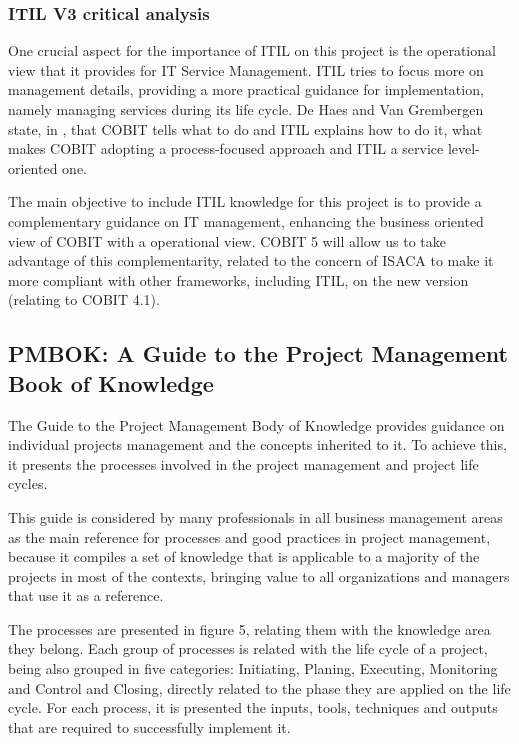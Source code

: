 \subsubsection{ITIL V3 critical analysis}

One crucial aspect for the importance of ITIL on this project is the operational view that it provides for IT Service Management. ITIL tries to focus more on management details, providing a more practical guidance for implementation, namely managing services during its life cycle. De Haes and Van Grembergen state, in \cite{ITGovAndMech}, that COBIT tells what to do and ITIL explains how to do it, what makes COBIT adopting a process-focused approach and ITIL a service level-oriented one.\par
The main objective to include ITIL knowledge for this project is to provide a complementary guidance on IT management, enhancing the business oriented view of COBIT with a operational view. COBIT 5 will allow us to take advantage of this complementarity, related to the concern of ISACA to make it more compliant with other frameworks, including ITIL, on the new version (relating to COBIT 4.1). 

\subsection{PMBOK: A Guide to the Project Management Book of Knowledge}

The Guide to the Project Management Body of Knowledge provides guidance on individual projects management and the concepts inherited to it. To achieve this, it presents the processes involved in the project management and project life cycles.\cite{pmbok5}\par
This guide is considered by many professionals in all business management areas as the main reference for processes and good practices in project management, because it compiles a set of knowledge that is applicable to a majority of the projects in most of the contexts, bringing value to all organizations and managers that use it as a reference.\par 
The processes are presented in figure 5, relating them with the knowledge area they belong. Each group of processes is related with the life cycle of a project, being also grouped in five categories: Initiating, Planing, Executing, Monitoring and Control and Closing, directly related to the phase they are applied on the life cycle. For each process, it is presented the inputs, tools, techniques and outputs that are required to successfully implement it.\par

